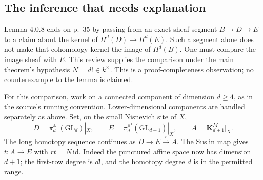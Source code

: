 \documentclass[10pt]{article}
\begin{document}
\subsection*{The inference that needs explanation}
Lemma 4.0.8 ends on p. 35 by passing from an exact sheaf segment \(B\to D\to E\) to a claim about the kernel of \(H^d(D)\to H^d(E)\). Such a segment alone does not make that cohomology kernel the image of \(H^d(B)\). One must compare the image sheaf with \(E\). This review supplies the comparison under the main theorem’s hypothesis \(N=d!\in k^\times\). This is a proof-completeness observation; no counterexample to the lemma is claimed.\par
For this comparison, work on a connected component of dimension \(d\geq4\), as in the source’s running convention. Lower-dimensional components are handled separately as above. Set, on the small Nisnevich site of \(X\), \[D=\pi^{\mathbb A^1}_d(\mathrm{GL}_d)|_X,\qquad
 E=\pi^{\mathbb A^1}_d(\mathrm{GL}_{d+1})|_X,\qquad
 A=\mathbf K_{d+1}^M|_X.\] The long homotopy sequence continues as \(D\to E\xrightarrow{r}A\). The Suslin map gives \(t:A\to E\) with \(rt=N\,\mathrm{id}\). Indeed the punctured affine space now has dimension \(d+1\); the first-row degree is \(d!\), and the homotopy degree \(d\) is in the permitted range.\par
\end{document}
